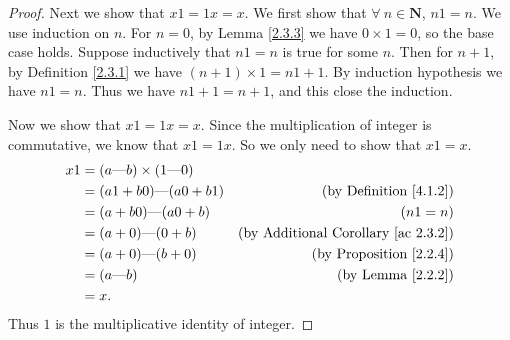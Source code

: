 \begin{proof}
    Next we show that \(x1 = 1x = x\).
    We first show that \(\forall\ n \in \mathbf{N}\), \(n1 = n\).
    We use induction on \(n\).
    For \(n=0\), by Lemma \ref{2.3.3} we have \(0 \times 1 = 0\), so the base case holds.
    Suppose inductively that \(n1 = n\) is true for some \(n\).
    Then for \(n + 1\), by Definition \ref{2.3.1} we have \((n + 1) \times 1 = n1 + 1\).
    By induction hypothesis we have \(n1 = n\).
    Thus we have \(n1 + 1 = n + 1\), and this close the induction.

    Now we show that \(x1 = 1x = x\).
    Since the multiplication of integer is commutative, we know that \(x1 = 1x\).
    So we only need to show that \(x1 = x\).
    \begin{align*}
        x1 & = (a \text{---} b) \times (1 \text{---} 0)                                                   \\
           & = (a1 + b0) \text{---} (a0 + b1)           & \text{(by Definition \ref{4.1.2})}              \\
           & = (a + b0) \text{---} (a0 + b)             & (n1 = n)                                        \\
           & = (a + 0) \text{---} (0 + b)               & \text{(by Additional Corollary \ref{ac 2.3.2})} \\
           & = (a + 0) \text{---} (b + 0)               & \text{(by Proposition \ref{2.2.4})}             \\
           & = (a \text{---} b)                         & \text{(by Lemma \ref{2.2.2})}                   \\
           & = x.
    \end{align*}
    Thus \(1\) is the multiplicative identity of integer.


\end{proof}
